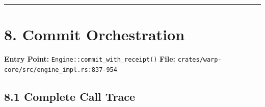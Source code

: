 \documentclass[
]{book}
\begin{document}
\begin{center}\rule{0.5\linewidth}{0.5pt}\end{center}

\section{8. Commit Orchestration}\label{commit-orchestration}

\textbf{Entry Point:} \texttt{Engine::commit\_with\_receipt()}
\textbf{File:} \texttt{crates/warp-core/src/engine\_impl.rs:837-954}

\subsection{8.1 Complete Call Trace}\label{complete-call-trace-3}
\end{document}
